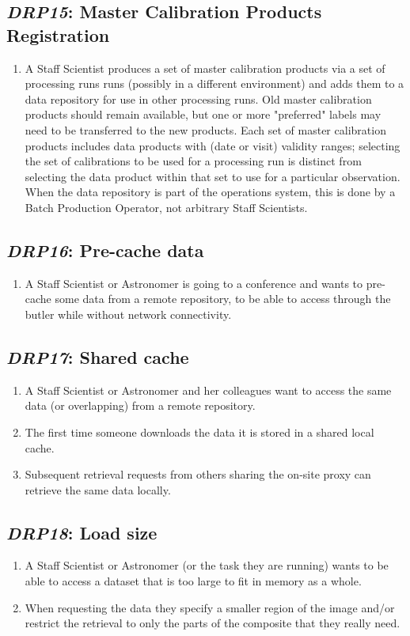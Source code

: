 \documentclass[DM,toc,lsstdraft]{lsstdoc}
\newcommand{\usecase}[3]{%
\subsection{\emph{#1}: #2}
\label{use:#1}
\begin{enumerate}[label=\alph*.]
#3
\end{enumerate}
}
\begin{document}
\usecase{DRP15}{Master Calibration Products Registration}{%

\item
A Staff Scientist produces a set of master calibration products via a set of processing runs runs (possibly in a different environment) and adds them to a data repository for use in other processing runs.
Old master calibration products should remain available, but one or more "preferred" labels may need to be transferred to the new products.
Each set of master calibration products includes data products with (date or visit) validity ranges; selecting the set of calibrations to be used for a processing run is distinct from selecting the data product within that set to use for a particular observation.
When the data repository is part of the operations system, this is done by a Batch Production Operator, not arbitrary Staff Scientists.
}

\usecase{DRP16}{Pre-cache data}{%

\item
A Staff Scientist or Astronomer is going to a conference and wants to pre-cache some data from a remote repository, to be able to access through the butler while without network connectivity.
}

\usecase{DRP17}{Shared cache}{%

\item
A Staff Scientist or Astronomer and her colleagues want to access the same data (or overlapping) from a remote repository.

\item
The first time someone downloads the data it is stored in a shared local cache.

\item
Subsequent retrieval requests from others sharing the on-site proxy can retrieve the same data locally.

}

\usecase{DRP18}{Load size}{%

\item
A Staff Scientist or Astronomer (or the task they are running) wants to be able to access a dataset that is too large to fit in memory as a whole.

\item
When requesting the data they specify a smaller region of the image and/or restrict the retrieval to only the parts of the composite that they really need.

}
\end{document}
